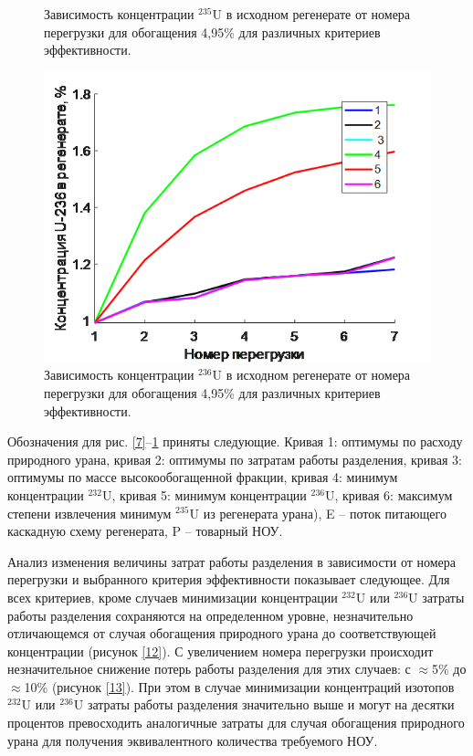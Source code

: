 \begin{figure}[ht]
\begin{minipage}{.5\textwidth}
      \caption{Зависимость концентрации $^{235}$U в исходном регенерате от номера перегрузки для обогащения 4,95\% для различных критериев эффективности.}
      \label{10}
    \end{minipage}
    \begin{minipage}{.5\textwidth}
        \centering
        \includegraphics[width=.8\linewidth]{images/net/11}  
        \caption{Зависимость концентрации $^{236}$U в исходном регенерате от номера перегрузки для обогащения 4,95\% для различных критериев эффективности.}
        \label{11}
      \end{minipage}
\end{figure}

Обозначения для рис. \ref{7}–\ref{11} приняты следующие. Кривая 1: оптимумы по расходу природного урана, кривая 2: оптимумы по затратам работы разделения, кривая 3: оптимумы по массе высокообогащенной фракции, кривая 4: минимум концентрации $^{232}$U, кривая 5: минимум концентрации $^{236}$U, кривая 6: максимум степени извлечения минимум $^{235}$U из регенерата урана), E – поток питающего каскадную схему регенерата, P -- товарный НОУ.


Анализ изменения величины затрат работы разделения в зависимости от номера перегрузки и выбранного критерия эффективности показывает следующее. Для всех критериев, кроме случаев минимизации концентрации $^{232}$U или $^{236}$U затраты работы разделения сохраняются на определенном уровне, незначительно отличающемся от случая обогащения природного урана до соответствующей концентрации (рисунок \ref{12}). С увеличением номера перегрузки происходит незначительное снижение потерь работы разделения для этих случаев: с $\approx$5\% до $\approx$10\% (рисунок \ref{13}). При этом в случае минимизации концентраций изотопов $^{232}$U или $^{236}$U затраты работы разделения значительно выше и  могут на десятки процентов превосходить аналогичные затраты для случая обогащения природного урана для получения эквивалентного количества требуемого НОУ.

